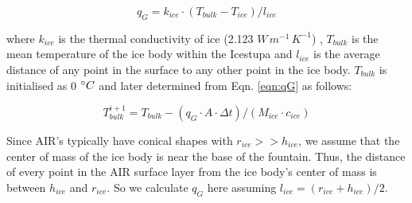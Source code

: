\documentclass[utf8]{frontiersSCNS} %
\begin{document}
\begin{equation} q_{G} = k_{ice} \cdot (T_{bulk}-T_{ice})/l_{ice} \label{eqn:qG}    \end{equation}

where $k_{ice}$ is the thermal conductivity of ice (2.123 $W\, m^{-1}\,K^{-1}$) , $T_{bulk}$ is the mean temperature of
the ice body within the Icestupa and $l_{ice}$ is the average distance of any point in the surface to any other point in
the ice body. $T_{bulk}$ is initialised as 0 $\degree C$ and later determined from Eqn. \ref{eqn:qG} as follows:

\begin{equation} T_{bulk}^{i+1} = T_{bulk} - (q_{G} \cdot A \cdot \Delta t)/(M_{ice} \cdot c_{ice}) \end{equation}

Since AIR's typically have conical shapes with $r_{ice} >> h_{ice}$, we assume that the center of mass of the ice body
is near the base of the fountain. Thus, the distance of every point in the AIR surface layer from the ice body's center
of mass is between $h_{ice}$ and $r_{ice}$. So we calculate $q_{G}$ here assuming $l_{ice} = (r_{ice} + h_{ice})/2$. 
\end{document}
